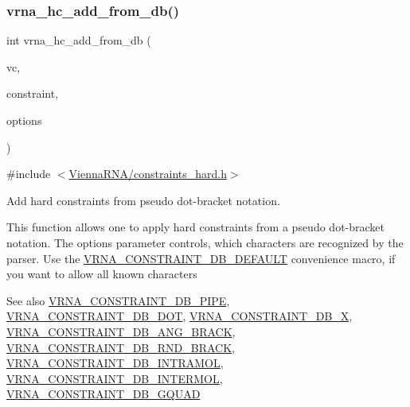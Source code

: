 \subsubsection{\texorpdfstring{vrna\+\_\+hc\+\_\+add\+\_\+from\+\_\+db()}{vrna\_hc\_add\_from\_db()}}
{\footnotesize\ttfamily int vrna\+\_\+hc\+\_\+add\+\_\+from\+\_\+db (\begin{DoxyParamCaption}\item[{\mbox{\hyperlink{group__fold__compound_ga1b0cef17fd40466cef5968eaeeff6166}{vrna\+\_\+fold\+\_\+compound\+\_\+t}} $\ast$}]{vc,  }\item[{const char $\ast$}]{constraint,  }\item[{unsigned int}]{options }\end{DoxyParamCaption})}



{\ttfamily \#include $<$\mbox{\hyperlink{constraints__hard_8h}{Vienna\+R\+N\+A/constraints\+\_\+hard.\+h}}$>$}



Add hard constraints from pseudo dot-\/bracket notation. 

This function allows one to apply hard constraints from a pseudo dot-\/bracket notation. The {\ttfamily options} parameter controls, which characters are recognized by the parser. Use the \mbox{\hyperlink{group__hard__constraints_ga1c3864bdc92147a4d93de2b1b4356177}{V\+R\+N\+A\+\_\+\+C\+O\+N\+S\+T\+R\+A\+I\+N\+T\+\_\+\+D\+B\+\_\+\+D\+E\+F\+A\+U\+LT}} convenience macro, if you want to allow all known characters

\begin{DoxySeeAlso}{See also}
\mbox{\hyperlink{group__hard__constraints_ga13053547a2de5532b64b64d35e097ae1}{V\+R\+N\+A\+\_\+\+C\+O\+N\+S\+T\+R\+A\+I\+N\+T\+\_\+\+D\+B\+\_\+\+P\+I\+PE}}, \mbox{\hyperlink{group__hard__constraints_ga369bea82eae75fbe626f409fa425747e}{V\+R\+N\+A\+\_\+\+C\+O\+N\+S\+T\+R\+A\+I\+N\+T\+\_\+\+D\+B\+\_\+\+D\+OT}}, \mbox{\hyperlink{group__hard__constraints_ga7283bbe0f8954f7b030ecc3f2d1932b2}{V\+R\+N\+A\+\_\+\+C\+O\+N\+S\+T\+R\+A\+I\+N\+T\+\_\+\+D\+B\+\_\+X}}, \mbox{\hyperlink{constraints__hard_8h_ad54c1315a47d55653dcaa5de6e544b77}{V\+R\+N\+A\+\_\+\+C\+O\+N\+S\+T\+R\+A\+I\+N\+T\+\_\+\+D\+B\+\_\+\+A\+N\+G\+\_\+\+B\+R\+A\+CK}}, \mbox{\hyperlink{group__hard__constraints_gac17b034852c914bc5879954c65d7e74b}{V\+R\+N\+A\+\_\+\+C\+O\+N\+S\+T\+R\+A\+I\+N\+T\+\_\+\+D\+B\+\_\+\+R\+N\+D\+\_\+\+B\+R\+A\+CK}}, \mbox{\hyperlink{group__hard__constraints_ga5c17253f5a39d1d49b0fb11f5196982a}{V\+R\+N\+A\+\_\+\+C\+O\+N\+S\+T\+R\+A\+I\+N\+T\+\_\+\+D\+B\+\_\+\+I\+N\+T\+R\+A\+M\+OL}}, \mbox{\hyperlink{group__hard__constraints_ga31d0ebb9755ca8a4acafc14f00ca755d}{V\+R\+N\+A\+\_\+\+C\+O\+N\+S\+T\+R\+A\+I\+N\+T\+\_\+\+D\+B\+\_\+\+I\+N\+T\+E\+R\+M\+OL}}, \mbox{\hyperlink{group__hard__constraints_ga75cfab03cdc97c95b3ce8bb29f52b08e}{V\+R\+N\+A\+\_\+\+C\+O\+N\+S\+T\+R\+A\+I\+N\+T\+\_\+\+D\+B\+\_\+\+G\+Q\+U\+AD}}
\end{DoxySeeAlso}

